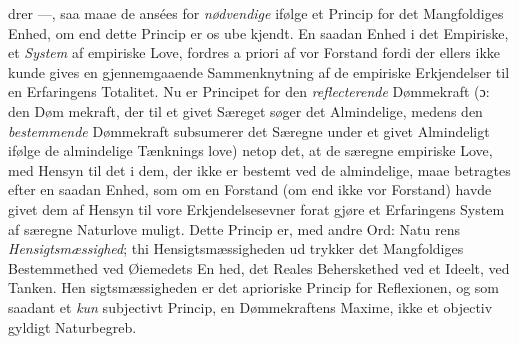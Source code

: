 \documentclass[12pt,a4paper]{book}
\begin{document}
drer ---, saa maae de ansées for \emph{nødvendige} ifølge et Princip
for det Mangfoldiges Enhed, om end dette Princip er os ube\-%
kjendt. En saadan Enhed i det Empiriske, et \emph{System} af
empiriske Love, fordres a priori af vor Forstand fordi der ellers
ikke kunde gives en gjennemgaaende Sammenknytning af de
empiriske Erkjendelser til en Erfaringens Totalitet. Nu er
Principet for den \emph{reflecterende} Dømmekraft (ɔ: den Døm\-%
mekraft, der til et givet Særeget søger det Almindelige, medens
den \emph{bestemmende} Dømmekraft subsumerer det Særegne
under et givet Almindeligt ifølge de almindelige Tænknings\-%
love) netop det, at de særegne empiriske Love, med Hensyn
til det i dem, der ikke er bestemt ved de almindelige, maae
betragtes efter en saadan Enhed, som om en Forstand (om
end ikke vor Forstand) havde givet dem af Hensyn til vore
Erkjendelsesevner forat gjøre et Erfaringens System af særegne
Naturlove muligt. Dette Princip er, med andre Ord: Natu\-%
rens \emph{Hensigtsmæssighed}; thi Hensigtsmæssigheden ud\-%
trykker det Mangfoldiges Bestemmethed ved Øiemedets En\-%
hed, det Reales Beherskethed ved et Ideelt, ved Tanken. Hen\-%
sigtsmæssigheden er det aprioriske Princip for Reflexionen, og
som saadant et \emph{kun} subjectivt Princip, en Dømmekraftens
Maxime, ikke et objectiv gyldigt Naturbegreb.
\end{document}

